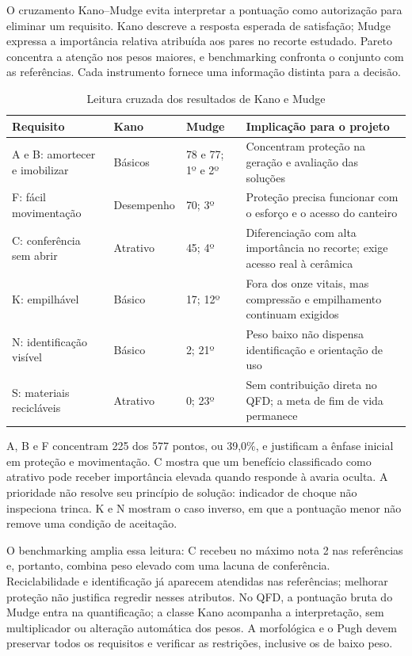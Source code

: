 O cruzamento Kano--Mudge evita interpretar a pontuação como autorização para eliminar um requisito. Kano descreve a resposta esperada de satisfação; Mudge expressa a importância relativa atribuída aos pares no recorte estudado. Pareto concentra a atenção nos pesos maiores, e benchmarking confronta o conjunto com as referências. Cada instrumento fornece uma informação distinta para a decisão.

\begin{table}[H]
\caption{Leitura cruzada dos resultados de Kano e Mudge}
\label{tab:cruzamento-kano-mudge}
\centering\scriptsize
\begin{tabularx}{\textwidth}{L{3.8cm}L{1.8cm}L{1.9cm}Y}
\toprule\textbf{Requisito}&\textbf{Kano}&\textbf{Mudge}&\textbf{Implicação para o projeto}\\\midrule
A e B: amortecer e imobilizar&Básicos&78 e 77; 1º e 2º&Concentram proteção na geração e avaliação das soluções\\
F: fácil movimentação&Desempenho&70; 3º&Proteção precisa funcionar com o esforço e o acesso do canteiro\\
C: conferência sem abrir&Atrativo&45; 4º&Diferenciação com alta importância no recorte; exige acesso real à cerâmica\\
K: empilhável&Básico&17; 12º&Fora dos onze vitais, mas compressão e empilhamento continuam exigidos\\
N: identificação visível&Básico&2; 21º&Peso baixo não dispensa identificação e orientação de uso\\
S: materiais recicláveis&Atrativo&0; 23º&Sem contribuição direta no QFD; a meta de fim de vida permanece\\
\bottomrule\end{tabularx}
\end{table}

A, B e F concentram 225 dos 577 pontos, ou 39,0\%, e justificam a ênfase inicial em proteção e movimentação. C mostra que um benefício classificado como atrativo pode receber importância elevada quando responde à avaria oculta. A prioridade não resolve seu princípio de solução: indicador de choque não inspeciona trinca. K e N mostram o caso inverso, em que a pontuação menor não remove uma condição de aceitação.

O benchmarking amplia essa leitura: C recebeu no máximo nota 2 nas referências e, portanto, combina peso elevado com uma lacuna de conferência. Reciclabilidade e identificação já aparecem atendidas nas referências; melhorar proteção não justifica regredir nesses atributos. No QFD, a pontuação bruta do Mudge entra na quantificação; a classe Kano acompanha a interpretação, sem multiplicador ou alteração automática dos pesos. A morfológica e o Pugh devem preservar todos os requisitos e verificar as restrições, inclusive os de baixo peso.

